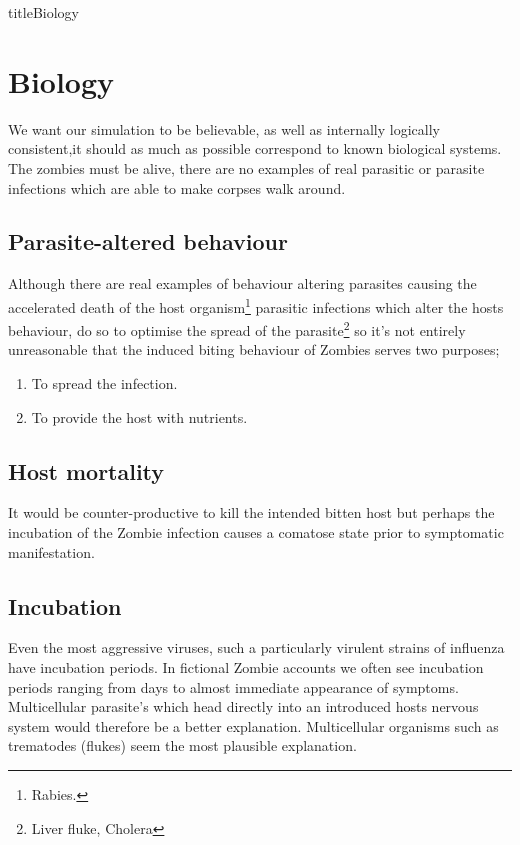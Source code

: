 \pagestyle{empty}
\setcounter{section}{2}

title{Biology}

\section{Biology}
We want our simulation to be believable, as well as internally logically consistent,it should as much as possible correspond to known biological systems. The zombies must be alive, there are no examples of real parasitic or parasite infections which are able to make corpses walk around.

\subsection{Parasite-altered behaviour}
Although there are real examples of behaviour altering parasites causing the accelerated death of the host organism\footnote{Rabies.} parasitic infections which alter the hosts behaviour, do so to optimise the spread of the parasite\footnote{Liver fluke, Cholera} so it's not entirely unreasonable that the induced biting behaviour of Zombies serves two purposes;
\begin{enumerate}
\item To spread the infection.
\item To provide the host with nutrients.
\end{enumerate}

\subsection{Host mortality}
It would be counter-productive to kill the intended bitten host but perhaps the incubation of the Zombie infection causes a comatose state prior to symptomatic manifestation.

\subsection{Incubation}
Even the most aggressive viruses, such a particularly virulent strains of influenza have incubation periods. In fictional Zombie accounts we often see incubation periods ranging from days to almost immediate appearance of symptoms. Multicellular parasite's which head directly into an introduced hosts nervous system would therefore be a better explanation. Multicellular organisms such as trematodes (flukes) seem the most plausible explanation.

